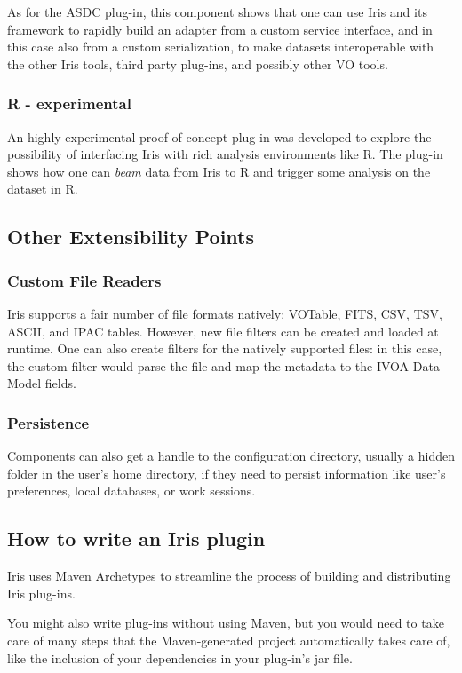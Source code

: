 As for the ASDC plug-in, this component shows that one can use Iris and its framework to rapidly build an adapter from a custom service interface, and in this case also from a custom serialization, to make datasets interoperable with the other Iris tools, third party plug-ins, and possibly other VO tools.

\subsubsection{R - experimental}
An highly experimental proof-of-concept plug-in was developed to explore the possibility of interfacing Iris with rich analysis environments like R. The plug-in shows how one can \emph{beam} data from Iris to R and trigger some analysis on the dataset in R.


\subsection{Other Extensibility Points}

\subsubsection{Custom File Readers}
Iris supports a fair number of ﬁle formats natively: VOTable,
FITS, CSV, TSV, ASCII, and IPAC tables. However, new ﬁle ﬁlters can be created and
loaded at runtime. One can also create ﬁlters for the natively supported ﬁles: in this
case, the custom ﬁlter would parse the ﬁle and map the metadata to the IVOA Data
Model ﬁelds.

\subsubsection{Persistence}
Components can also get a handle to the configuration directory, usually a hidden folder in the user's home directory, if they need to persist information like user's preferences, local databases, or work sessions.



\subsection{How to write an Iris plugin}
\label{sec:writeplugin}
Iris uses Maven Archetypes to streamline the process of building and distributing Iris plug-ins.

You might also write plug-ins without using Maven, but you would need to take care of many steps that the Maven-generated project automatically takes care of, like the inclusion of your dependencies in your plug-in's jar file.

